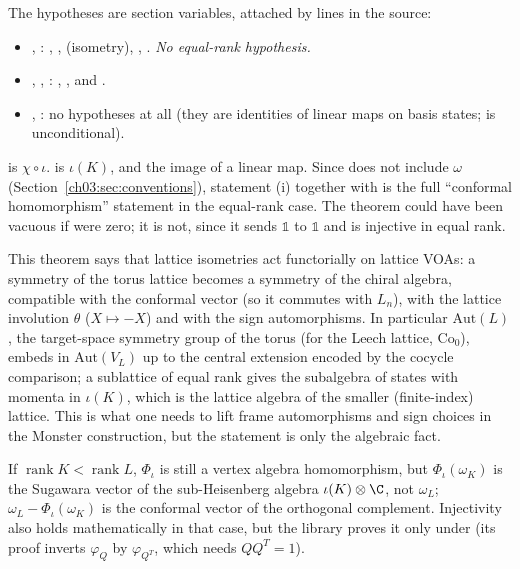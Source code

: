 \begin{dictionary}
The hypotheses are section variables, attached by  lines in the source:
\begin{itemize}
\item {}, : , ,
   (isometry), , . \emph{No equal-rank hypothesis.}
\item {}, , :
  , ,  and .
\item {}, : no hypotheses at all (they are identities
  of linear maps on basis states;  is unconditional).
\end{itemize}
 is $\chi\circ\iota$.  is $\iota(K)$, and
 the image of a linear map. Since  does not include $\omega$
(Section~\ref{ch03:sec:conventions}), statement (i) together with  is the full
``conformal homomorphism'' statement in the equal-rank case. The theorem could have been vacuous
if  were zero; it is not, since it sends $\mathbb 1$ to $\mathbb 1$ and is injective
in equal rank.
\end{dictionary}

\begin{physics}
This theorem says that lattice isometries act functorially on lattice VOAs: a symmetry of the torus lattice becomes a symmetry of the chiral algebra, compatible with the conformal vector (so it commutes with $L_n$), with the lattice involution $\theta$ ($X\mapsto-X$) and with the sign automorphisms. In particular $\mathrm{Aut}(L)$, the target-space symmetry group of the torus (for the Leech lattice, $\mathrm{Co}_0$), embeds in $\mathrm{Aut}(V_L)$ up to the central extension encoded by the cocycle comparison; a sublattice of equal rank gives the subalgebra of states with momenta in $\iota(K)$, which is the lattice algebra of the smaller (finite-index) lattice. This is what one needs to lift frame automorphisms and sign choices in the Monster construction, but the statement is only the algebraic fact.
\end{physics}

\begin{remark}\label{ch03:rem:notconformal}
If $\operatorname{rank}K<\operatorname{rank}L$, $\Phi_\iota$ is still a vertex algebra
homomorphism, but $\Phi_\iota(\omega_K)$ is the Sugawara vector of the sub-Heisenberg algebra
$\iota(K)\otimes\C$, not $\omega_L$; $\omega_L-\Phi_\iota(\omega_K)$ is the conformal vector of the
orthogonal complement. Injectivity also holds mathematically in that case, but the library proves
it only under  (its proof inverts $\varphi_Q$ by $\varphi_{Q^T}$, which needs
$QQ^T=1$).
\end{remark}

